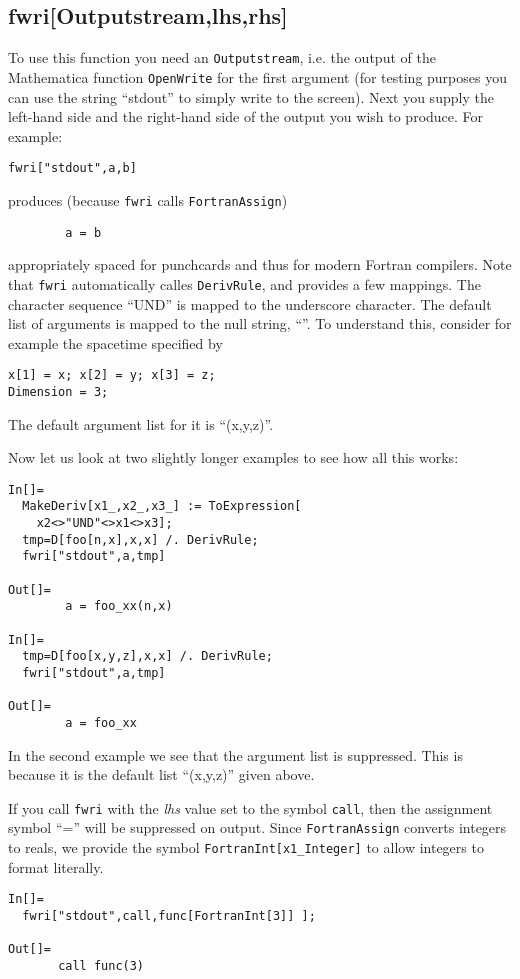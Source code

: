 \subsection{fwri[Outputstream,lhs,rhs]}
To use this function you need an {\tt Outputstream}, i.e. the output
of the Mathematica function {\tt OpenWrite} for the first argument
(for testing purposes you can use the string ``stdout'' to simply
write to the screen).  Next you supply the left-hand side and the
right-hand side of the output you wish to produce.  For example:
\begin{verbatim}
fwri["stdout",a,b]
\end{verbatim}
produces (because {\tt fwri} calls {\tt FortranAssign})
\begin{verbatim}
        a = b
\end{verbatim}
appropriately spaced for punchcards and thus for modern Fortran
compilers.  Note that {\tt fwri} automatically calles {\tt DerivRule},
and provides a few mappings.  The character sequence ``UND'' is mapped
to the underscore character.  The default list of arguments is mapped
to the null string, ``''. To understand this, consider for example the
spacetime specified by
\begin{verbatim}
x[1] = x; x[2] = y; x[3] = z;
Dimension = 3;
\end{verbatim}
The default argument list for it is ``(x,y,z)''.

Now let us look at two slightly longer examples to see how all this
works:
\begin{verbatim}
In[]=
  MakeDeriv[x1_,x2_,x3_] := ToExpression[
    x2<>"UND"<>x1<>x3];
  tmp=D[foo[n,x],x,x] /. DerivRule;
  fwri["stdout",a,tmp]

Out[]=
        a = foo_xx(n,x)

In[]=
  tmp=D[foo[x,y,z],x,x] /. DerivRule;
  fwri["stdout",a,tmp]

Out[]=
        a = foo_xx
\end{verbatim}
In the second example we see that the argument list is suppressed.
This is because it is the default list ``(x,y,z)'' given above.

If you call {\tt fwri} with the {\it lhs} value set to
the symbol {\tt call}, then the assignment symbol ``='' will be suppressed on
output.  Since {\tt FortranAssign} converts integers to reals, we provide
the symbol {\tt FortranInt[x1\_Integer]} to allow integers to format literally.
\begin{verbatim}
In[]=
  fwri["stdout",call,func[FortranInt[3]] ];

Out[]=
       call func(3)
\end{verbatim}

